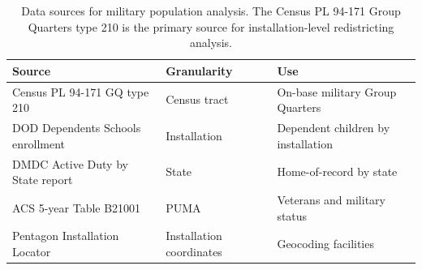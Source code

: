 \begin{table}[h]
\centering
\begin{tabular}{lll}
\toprule
\textbf{Source} & \textbf{Granularity} & \textbf{Use} \\
\midrule
Census PL 94-171 GQ type 210 & Census tract & On-base military Group Quarters \\
DOD Dependents Schools enrollment & Installation & Dependent children by installation \\
DMDC Active Duty by State report & State & Home-of-record by state \\
ACS 5-year Table B21001 & PUMA & Veterans and military status \\
Pentagon Installation Locator & Installation coordinates & Geocoding facilities \\
\bottomrule
\end{tabular}
\caption{Data sources for military population analysis. The Census PL 94-171 Group Quarters type 210 is the primary source for installation-level redistricting analysis.}
\label{tab:data-sources}
\end{table}
